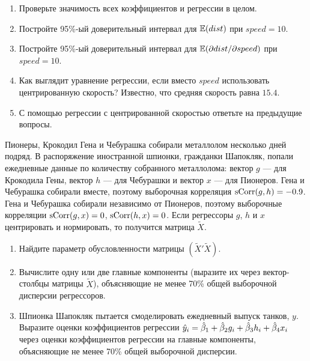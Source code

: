 \begin{problem}
\begin{enumerate}
\item Проверьте значимость всех коэффициентов и регрессии в целом.
\item Постройте 95\%-ый доверительный интервал для $\mathbb{E}(dist)$ при $speed=10$.
\item Постройте 95\%-ый доверительный интервал для $\mathbb{E}(\partial dist/ \partial speed)$ при $speed=10$.
\item Как выглядит уравнение регрессии, если вместо $speed$ использовать центрированную скорость? Известно, что средняя скорость равна $15.4$. 
\item С помощью регрессии с центрированной скоростью ответьте на предыдущие вопросы.
\end{enumerate}

\begin{sol}
\end{sol}
\end{problem}


\begin{problem}
Пионеры, Крокодил Гена и Чебурашка собирали металлолом несколько дней подряд. 
В распоряжение иностранной шпионки, гражданки Шапокляк, попали ежедневные данные по количеству собранного металлолома: 
вектор $g$ — для Крокодила Гены, вектор $h$ — для Чебурашки и вектор $x$ — для Пионеров. 
Гена и Чебурашка собирали вместе, поэтому выборочная корреляция $\operatorname{sCorr}(g,h)=-0.9$. 
Гена и Чебурашка собирали независимо от Пионеров, поэтому выборочные корреляции $\operatorname{sCorr}(g,x)=0$, $\operatorname{sCorr}(h,x)=0$. 
Если регрессоры $g$, $h$ и $x$ центрировать и нормировать, то получится матрица $\tilde{X}$.
\begin{enumerate}
\item Найдите параметр обусловленности матрицы $(\tilde{X}'\tilde{X})$.
\item Вычислите одну или две главные компоненты (выразите их через вектор-столбцы матрицы $\tilde{X}$), 
объясняющие не менее 70\% общей выборочной дисперсии регрессоров.
\item Шпионка Шапокляк пытается смоделировать ежедневный выпуск танков, $y$. 
Выразите оценки коэффициентов регрессии $\hat{y}_i = \hat{\beta}_1 + \hat{\beta}_2 g_i +\hat{\beta}_3 h_i +\hat{\beta}_4 x_i$ 
через оценки коэффициентов регрессии на главные компоненты, объясняющие не менее 70\% общей выборочной дисперсии.
\end{enumerate}

\begin{sol}
\end{sol}
\end{problem}




